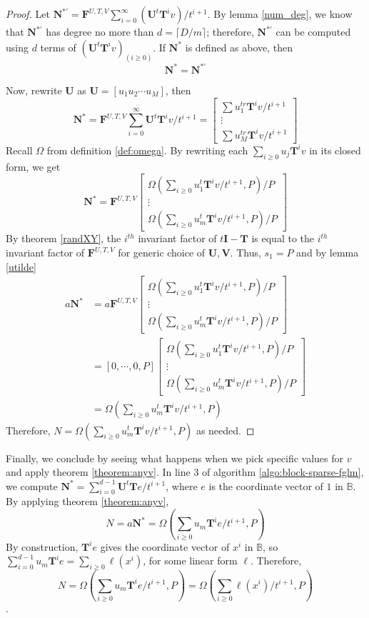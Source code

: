 \documentclass[12pt]{article}
\def\mF{\mathbf{F}}
\def\mI{\mathbf{I}}
\def\mN{\mathbf{N}}
\def\mT{\mathbf{T}}
\def\mU{\mathbf{U}}
\def\mV{\mathbf{V}}
\begin{document}
\begin{proof}
	Let $\mN^{*'} = \mF^{U,T,V} \sum_{i=0}^{\infty} (\mU^t\mT^iv)/t^{i+1}$.
	By lemma \ref{num_deg}, we know that $\mN^{*'}$ has degree no more than
	$d = \lceil D/m \rceil $; therefore, $\mN^{*'}$ can be computed using $d$
	terms of $(\mU^t\mT^i v)_{(i\ge 0)}$. If $\mN^*$ is
	defined as above, then 
	$$ \mN^* = \mN^{*'}$$
	
	Now, rewrite $\mU$ as $\mU = [u_1 u_2 \cdots u_M]$, then
	$$
	\mN^* = \mF^{U,T,V}
	\sum_{i=0}^{\infty} \mU^t \mT^i v / t^{i+1} =
	\begin{bmatrix}
	\sum u_1^{tr}\mT^iv/t^{i+1}\\
	\vdots                   \\
	\sum u_M^{tr}\mT^iv/t^{i+1}
	\end{bmatrix}$$
	Recall $\Omega$ from definition \ref{def:omega}.
	By rewriting each $\sum_{i\ge0} u_j \mT^i v$ in its closed form, we get
	$$ \mN^* = \mF^{U,T,V}
	\begin{bmatrix}
	\Omega(\sum_{i\ge0} u_1^t \mT^i v/t^{i+1},P) / P \\
	\vdots      \\
	\Omega(\sum_{i\ge0} u_m^t \mT^i v/t^{i+1},P) / P 
	\end{bmatrix}
	$$
	By theorem \ref{randXY}, the $i^{th}$ invariant factor of
	$t\mI - \mT$ is equal to the $i^{th}$ invariant factor of $\mF^{U,T,V}$ 
	for generic choice of
	$\mU,\mV$. Thus, $s_1 = P$ and by lemma \ref{utilde}
	\begin{align*}
	a \mN^* &= a \mF^{U,T,V}
	\begin{bmatrix}
	\Omega(\sum_{i\ge0} u_1^t \mT^i v/t^{i+1},P) / P \\
	\vdots      \\
	\Omega(\sum_{i\ge0} u_m^t \mT^i v/t^{i+1},P) / P 
	\end{bmatrix}\\
	&= [0,\cdots,0,P]
	\begin{bmatrix}
	\Omega(\sum_{i\ge0} u_1^t \mT^i v/t^{i+1},P) / P \\
	\vdots      \\
	\Omega(\sum_{i\ge0} u_m^t \mT^i v/t^{i+1},P) / P 
	\end{bmatrix}\\
	&= \Omega(\sum_{i\ge0} u_m^t \mT^i v/t^{i+1},P)
	\end{align*}
	Therefore, $N = \Omega(\sum_{i\ge0} u_m^t \mT^i v/t^{i+1},P)$ as needed.
\end{proof}

Finally, we conclude by seeing what happens
when we pick specific values for $v$ and apply theorem \ref{theorem:anyv}.
In line 3 of algorithm \ref{algo:block-sparse-fglm}, we compute
$\mN^* = \sum_{i=0}^{d-1}\mU^t \mT e/t^{i+1}$, 
where $e$ is the coordinate vector of $1$ in $\mathbb{B}$. By applying theorem \ref{theorem:anyv},
$$N = a\mN^* = \Omega(\sum_{i\ge 0} u_m \mT^i e/t^{i+1},P)$$
By construction,
$\mT^i e$ gives the coordinate vector of $x^i$ in $\mathbb{B}$, so
$\sum_{i= 0}^{d-1} u_m \mT^i e = \sum_{i\ge0} \ell(x^i)$, for some linear form
$\ell$. Therefore, 
$$N = \Omega(\sum_{i\ge 0} u_m \mT^i e/t^{i+1},P) = \Omega(\sum_{i\ge 0} \ell(x^i) /t^{i+1},P)$$.
\end{document}
